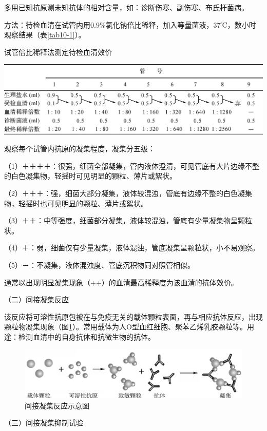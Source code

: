 多用已知抗原测未知抗体的相对含量，如：诊断伤寒、副伤寒、布氏杆菌病。

方法：待检血清在试管内用0.9\%氯化钠倍比稀释，加入等量菌液，37℃，数小时观察结果（表\ref{tab10-1}）。
　
\begin{table}[htbp]
    \centering
    \caption{试管倍比稀释法测定待检血清效价}
    \label{tab10-1}
\includegraphics[width=.8\textwidth]{./images/Image00154.jpg}
\end{table}

观察每个试管内抗原的凝集程度，凝集分五级：

（1）＋＋＋＋：很强，细菌全部凝集，管内液体澄清，可见管底有大片边缘不整的白色凝集物，轻摇时可见明显的颗粒、薄片或絮状。

（2）＋＋＋：强，细菌大部分凝集，液体较混浊，管底有边缘不整的白色凝集物，轻摇时也可见明显的颗粒、薄片或絮状。

（3）＋＋：中等强度，细菌部分凝集，液体较混浊，管底有少量凝集物呈颗粒状。

（4）＋：弱，细菌仅有少量凝集，液体混浊，管底凝集呈颗粒状，小不易观察。

（5）－：不凝集，液体混浊度、管底沉积物同对照管相似。

通常以出现明显凝集现象（++）的血清最高稀释度为该血清的抗体效价。

（二）间接凝集反应

该反应将可溶性抗原包被在与免疫无关的载体颗粒表面，再与相应抗体反应，出现颗粒物凝集现象（图\ref{fig10-3}）。常用载体为人O型血红细胞、聚苯乙烯乳胶颗粒等。用途：检测血清中的自身抗体和抗微生物的抗体。

\begin{figure}[!htbp]
 \centering
 \includegraphics{./images/Image00155.jpg}
 \captionsetup{justification=centering}
 \caption{间接凝集反应示意图}
 \label{fig10-3}
  \end{figure} 

（三）间接凝集抑制试验

